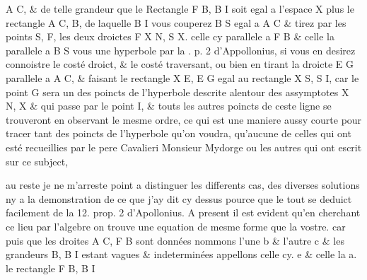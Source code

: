 \documentclass[11pt,a4paper]{article}
\begin{document}
A C, \& de telle grandeur que le Rectangle F B, B I soit egal a l'espace X plus le rectangle A C,  B, de laquelle B I vous couperez B S egal a A C \& tirez par les points S, F, les deux droictes F X N, S X. celle cy parallele a F B \& celle la parallele a B S  vous  une hyperbole par la . p. 2  d'Appollonius, si vous en desirez connoistre le costé  droict, \& le costé traversant, ou bien en tirant la droicte E G parallele a A C, \& faisant le rectangle X E, E G egal au rectangle X S,  S I, car le point G sera un des poincts de l'hyperbole descrite alentour des assymptotes X N,  X \& qui passe par le point I, \& touts les autres poincts de ceste ligne se trouveront en observant le mesme ordre, ce qui est une maniere aussy courte pour tracer tant des poincts de l'hyperbole qu'on voudra, qu'aucune de celles qui ont esté recueillies par le pere Cavalieri Monsieur Mydorge ou les autres qui ont escrit sur ce subject,

au reste je ne m'arreste point a distinguer les differents cas, des diverses solutions ny a la demonstration de ce que j'ay dit cy dessus pource que le tout se deduict facilement de la 12. prop. 2 d'Apollonius. A present il est evident qu'en cherchant ce lieu par l'algebre on trouve une equation de mesme forme que la vostre. car puis que les droites A C, F B sont données nommons l'une b \& l'autre c \& les grandeurs  B, B I estant vagues \& indeterminées appellons celle cy. e \& celle la a. le rectangle F B, B I
\end{document}
